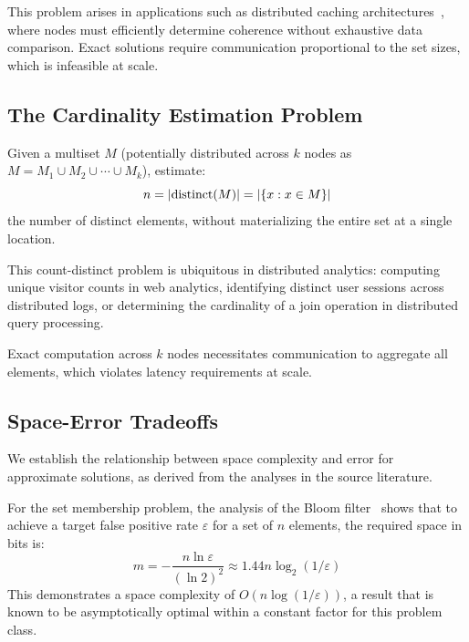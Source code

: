 This problem arises in applications such as distributed caching architectures~\cite{ramabaja2019distributed}, where nodes must efficiently determine coherence without exhaustive data comparison. Exact solutions require communication proportional to the set sizes, which is infeasible at scale.

\subsection{The Cardinality Estimation Problem}

\begin{definition}
    Given a multiset $M$ (potentially distributed across $k$ nodes as $M = M_1 \cup M_2 \cup \cdots \cup M_k$), estimate:
    \begin{equation}
        n = |{\rm distinct}(M)| = |\{x : x \in M\}|
    \end{equation}
    the number of distinct elements, without materializing the entire set at a single location.
\end{definition}

This count-distinct problem is ubiquitous in distributed analytics: computing unique visitor counts in web analytics, identifying distinct user sessions across distributed logs, or determining the cardinality of a join operation in distributed query processing.

Exact computation across $k$ nodes necessitates communication to aggregate all elements, which violates latency requirements at scale.

\subsection{Space-Error Tradeoffs}

We establish the relationship between space complexity and error for approximate solutions, as derived from the analyses in the source literature.

For the set membership problem, the analysis of the Bloom filter~\cite{tarkoma2011theory} shows that to achieve a target false positive rate $\varepsilon$ for a set of $n$ elements, the required space in bits is:
\begin{equation}
    m = -\frac{n\ln \varepsilon}{(\ln 2)^2} \approx 1.44 n \log_2(1/\varepsilon)
\end{equation}
This demonstrates a space complexity of $O(n \log(1/\varepsilon))$, a result that is known to be asymptotically optimal within a constant factor for this problem class.


